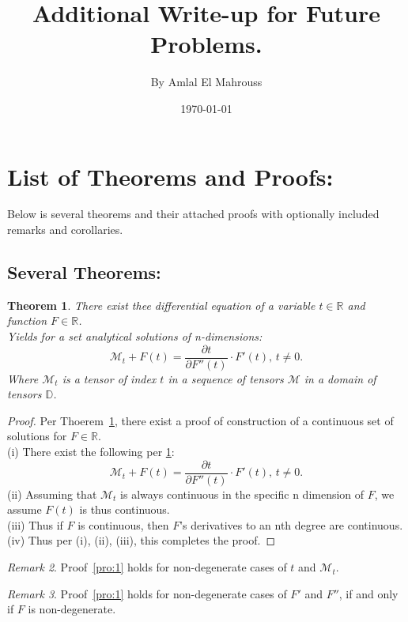 \documentclass[10pt]{article}
\title{%
	\vspace{-1.5em}%
	\large\textbf{Additional Write-up for Future Problems.}%
}
\author{By Amlal El Mahrouss}
\date{\today}
\theoremstyle{plain}
\newtheorem{theorem}{Theorem}[section]
\theoremstyle{definition}
\theoremstyle{remark}
\newtheorem{remark}[theorem]{Remark}
\begin{document}

\maketitle
\tableofcontents
\newpage

\section{List of Theorems and Proofs:}

Below is several theorems and their attached proofs with optionally included remarks and corollaries. 

\subsection{Several Theorems:}

\begin{theorem}
\label{theo:1}
There exist thee differential equation of a variable $t \in \mathbb{R}$ and function $F \in \mathbb{R}$.\\
Yields for a set analytical solutions of n-dimensions:
\begin{equation}
	\mathcal{M}_{t} + F(t) = \frac{\partial t}{\partial F''(t)} \cdot F'(t), \, t \neq 0.
\end{equation}
Where $\mathcal{M}_{t}$ is a tensor of index $t$ in a sequence of tensors $\mathcal{M}$ in a domain of tensors $\mathbb{D}$.
\end{theorem}
\begin{proof}
\label{pro:1}
Per Thoerem~\ref{theo:1}, there exist a proof of construction of a continuous set of solutions for $F \in \mathbb{R}$.\\
(i) There exist the following per \ref{theo:1}:
\begin{equation}
	\mathcal{M}_{t} + F(t) = \frac{\partial t}{\partial F''(t)} \cdot F'(t), \, t \neq 0.
\end{equation}
(ii) Assuming that $\mathcal{M}_t$ is always continuous in the specific n dimension of $F$, we assume $F(t)$ is thus continuous.\\
(iii) Thus if $F$ is continuous, then $F$'s derivatives to an nth degree are continuous.\\
(iv) Thus per (i), (ii), (iii), this completes the proof.
\end{proof}
\begin{remark}
Proof~\ref{pro:1} holds for non-degenerate cases of $t$ and $\mathcal{M}_{t}$.
\end{remark}
\begin{remark}
Proof~\ref{pro:1} holds for non-degenerate cases of $F'$ and $F''$, if and only if $F$ is non-degenerate.
\end{remark}
\end{document}
